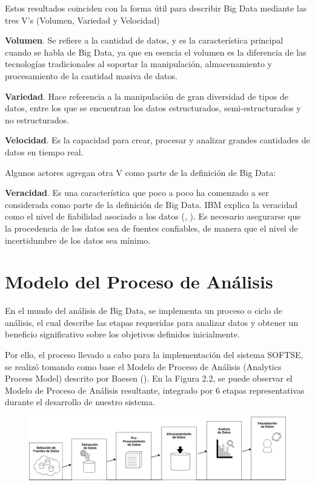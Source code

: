 Estos resultados coinciden con la forma útil para describir Big Data mediante las tres V’s (Volumen, Variedad y Velocidad)

\textbf{Volumen}. Se refiere a la cantidad de datos, y es la característica principal cuando se habla de Big Data, ya que en esencia el volumen es la diferencia de las tecnologías tradicionales al soportar la manipulación, almacenamiento y procesamiento de  la cantidad masiva de datos.

\textbf{Variedad}. Hace referencia a la manipulación de gran diversidad de tipos de datos, entre los que se encuentran los datos estructurados, semi-estructurados y no estructurados.

\textbf{Velocidad}. Es la capacidad para crear, procesar y analizar grandes cantidades de datos en tiempo real.

Algunos actores agregan otra V como parte de la definición de Big Data:

\textbf{Veracidad}. Es una característica que poco a poco ha comenzado a ser considerada como  parte de la definición de Big Data. IBM explica la veracidad como el nivel de fiabilidad asociado a los datos (\citeauthor{artBigData}, \citeyear{artBigData}). Es necesario asegurarse que la procedencia de los datos sea de fuentes confiables, de manera que el nivel de incertidumbre de los datos sea mínimo. 

\section{Modelo del Proceso de Análisis}
\label{sec:sec02}

En el mundo del análisis de Big Data, se implementa un proceso o ciclo de análisis, el cual describe las etapas requeridas para analizar datos y obtener un beneficio significativo sobre los objetivos definidos inicialmente. 

Por ello, el proceso llevado a cabo para la implementación del sistema SOFTSE, se realizó tomando como base el Modelo de Proceso de Análisis (Analytics Process Model) descrito por Baesen (\citeyear{Analytics}). En la Figura 2.2, se puede observar el Modelo de Proceso de Análisis resultante, integrado por 6 etapas representativas durante el desarrollo de nuestro sistema. 

\begin{figure}[H]
	\centering
	\includegraphics[height=0.17\textheight]{fig01/procesotesis.png}
	\label{fig:RHP02}
\end{figure}

